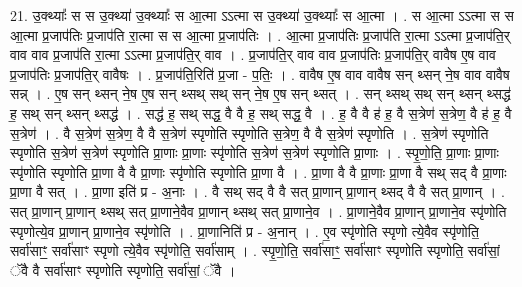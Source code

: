 \documentclass[17pt]{extarticle}
\begin{document}
21. उ॒क्थ्याः᳚ स स उ॒क्थ्या॑ उ॒क्थ्याः᳚ स आ॒त्मा ऽऽत्मा स उ॒क्थ्या॑ उ॒क्थ्याः᳚ स आ॒त्मा । . स आ॒त्मा ऽऽत्मा स स आ॒त्मा प्र॒जाप॑तिः प्र॒जाप॑ति रा॒त्मा स स आ॒त्मा प्र॒जाप॑तिः । . आ॒त्मा प्र॒जाप॑तिः प्र॒जाप॑ति रा॒त्मा ऽऽत्मा प्र॒जाप॑ति॒र् वाव वाव प्र॒जाप॑ति रा॒त्मा ऽऽत्मा प्र॒जाप॑ति॒र् वाव । . प्र॒जाप॑ति॒र् वाव वाव प्र॒जाप॑तिः प्र॒जाप॑ति॒र् वावैष ए॒ष वाव प्र॒जाप॑तिः प्र॒जाप॑ति॒र् वावैषः । . प्र॒जाप॑ति॒रिति॑ प्र॒जा - प॒तिः॒ । . वावैष ए॒ष वाव वावैष सन् थ्सन् ने॒ष वाव वावैष सन्न् । . ए॒ष सन् थ्सन् ने॒ष ए॒ष सन् थ्सथ् सथ् सन् ने॒ष ए॒ष सन् थ्सत् । . सन् थ्सथ् सथ् सन् थ्सन् थ्सद्ध॑ ह॒ सथ् सन् थ्सन् थ्सद्ध॑ । . सद्ध॑ ह॒ सथ् सद्ध॒ वै वै ह॒ सथ् सद्ध॒ वै । . ह॒ वै वै ह॑ ह॒ वै स॒त्रेण॑ स॒त्रेण॒ वै ह॑ ह॒ वै स॒त्रेण॑ । . वै स॒त्रेण॑ स॒त्रेण॒ वै वै स॒त्रेण॑ स्पृणोति स्पृणोति स॒त्रेण॒ वै वै स॒त्रेण॑ स्पृणोति । . स॒त्रेण॑ स्पृणोति स्पृणोति स॒त्रेण॑ स॒त्रेण॑ स्पृणोति प्रा॒णाः प्रा॒णाः स्पृ॑णोति स॒त्रेण॑ स॒त्रेण॑ स्पृणोति प्रा॒णाः । . स्पृ॒णो॒ति॒ प्रा॒णाः प्रा॒णाः स्पृ॑णोति स्पृणोति प्रा॒णा वै वै प्रा॒णाः स्पृ॑णोति स्पृणोति प्रा॒णा वै । . प्रा॒णा वै वै प्रा॒णाः प्रा॒णा वै सथ् सद् वै प्रा॒णाः प्रा॒णा वै सत् । . प्रा॒णा इति॑ प्र - अ॒नाः । . वै सथ् सद् वै वै सत् प्रा॒णान् प्रा॒णान् थ्सद् वै वै सत् प्रा॒णान् । . सत् प्रा॒णान् प्रा॒णान् थ्सथ् सत् प्रा॒णाने॒वैव प्रा॒णान् थ्सथ् सत् प्रा॒णाने॒व । . प्रा॒णाने॒वैव प्रा॒णान् प्रा॒णाने॒व स्पृ॑णोति स्पृणोत्ये॒व प्रा॒णान् प्रा॒णाने॒व स्पृ॑णोति । . प्रा॒णानिति॑ प्र - अ॒नान् । . ए॒व स्पृ॑णोति स्पृणो त्ये॒वैव स्पृ॑णोति॒ सर्वा॑साꣳ॒॒ सर्वा॑साꣳ स्पृणो त्ये॒वैव स्पृ॑णोति॒ सर्वा॑साम् । . स्पृ॒णो॒ति॒ सर्वा॑साꣳ॒॒ सर्वा॑साꣳ स्पृणोति स्पृणोति॒ सर्वा॑सां॒ ॅवै वै सर्वा॑साꣳ स्पृणोति स्पृणोति॒ सर्वा॑सां॒ ॅवै । \newline
\end{document}
